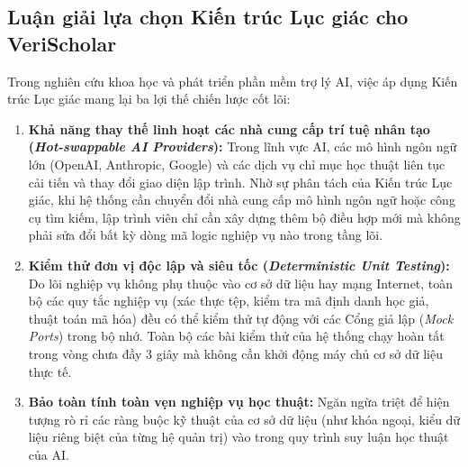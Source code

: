 \subsection{Luận giải lựa chọn Kiến trúc Lục giác cho VeriScholar}
\label{subsec:luan_giai_hexagonal}
Trong nghiên cứu khoa học và phát triển phần mềm trợ lý AI, việc áp dụng Kiến trúc Lục giác mang lại ba lợi thế chiến lược cốt lõi:
\begin{enumerate}[label=\textbf{(\arabic*)}]
    \item \textbf{Khả năng thay thế linh hoạt các nhà cung cấp trí tuệ nhân tạo (\textit{Hot-swappable AI Providers}):} Trong lĩnh vực AI, các mô hình ngôn ngữ lớn (OpenAI, Anthropic, Google) và các dịch vụ chỉ mục học thuật liên tục cải tiến và thay đổi giao diện lập trình. Nhờ sự phân tách của Kiến trúc Lục giác, khi hệ thống cần chuyển đổi nhà cung cấp mô hình ngôn ngữ hoặc công cụ tìm kiếm, lập trình viên chỉ cần xây dựng thêm bộ điều hợp mới mà không phải sửa đổi bất kỳ dòng mã logic nghiệp vụ nào trong tầng lõi.
    \item \textbf{Kiểm thử đơn vị độc lập và siêu tốc (\textit{Deterministic Unit Testing}):} Do lõi nghiệp vụ không phụ thuộc vào cơ sở dữ liệu hay mạng Internet, toàn bộ các quy tắc nghiệp vụ (xác thực tệp, kiểm tra mã định danh học giả, thuật toán mã hóa) đều có thể kiểm thử tự động với các Cổng giả lập (\textit{Mock Ports}) trong bộ nhớ. Toàn bộ các bài kiểm thử của hệ thống chạy hoàn tất trong vòng chưa đầy 3 giây mà không cần khởi động máy chủ cơ sở dữ liệu thực tế.
    \item \textbf{Bảo toàn tính toàn vẹn nghiệp vụ học thuật:} Ngăn ngừa triệt để hiện tượng rò rỉ các ràng buộc kỹ thuật của cơ sở dữ liệu (như khóa ngoại, kiểu dữ liệu riêng biệt của từng hệ quản trị) vào trong quy trình suy luận học thuật của AI.
\end{enumerate}
